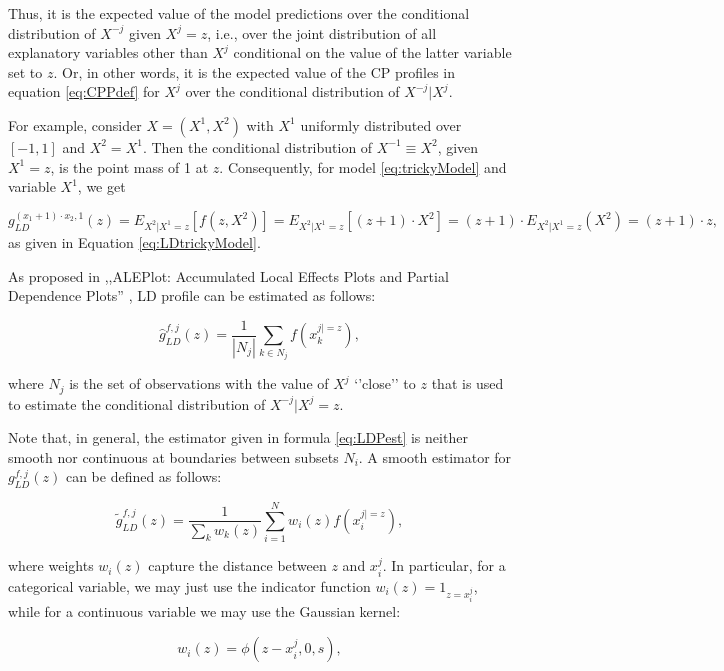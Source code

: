 \documentclass[]{krantz}
\begin{document}
Thus, it is the expected value of the model predictions over the conditional distribution of \(X^{-j}\) given \(X^j=z\), i.e., over the joint distribution of all explanatory variables other than \(X^j\) conditional on the value of the latter variable set to \(z\). Or, in other words, it is the expected value of the CP profiles in equation \eqref{eq:CPPdef} for \(X^j\) over the conditional distribution of \(X^{-j} | X^j\).

For example, consider \(X=(X^1,X^2)\) with \(X^1\) uniformly distributed over \([-1,1]\) and \(X^2=X^1\). Then the conditional distribution of \(X^{-1} \equiv X^2\), given \(X^1=z\), is the point mass of 1 at \(z\). Consequently, for model \eqref{eq:trickyModel} and variable \(X^1\), we get

\[
g_{LD}^{(x_1+1)\cdot x_2,1}(z) = E_{X^2|X^1=z}[f(z,X^2)] = E_{X^2|X^1=z}[(z+1)\cdot X^2] = (z+1)\cdot E_{X^2|X^1=z}(X^2) = (z+1)\cdot z,
\]
as given in Equation \eqref{eq:LDtrickyModel}.

As proposed in ,,ALEPlot: Accumulated Local Effects Plots and Partial Dependence Plots'' \citep{ALEPlotRPackage}, LD profile can be estimated as follows:

\begin{equation}
\hat g_{LD}^{f,j}(z) = \frac{1}{|N_j|} \sum_{k\in N_j} f\left(x_k^{j| = z}\right), 
\label{eq:LDPest}
\end{equation}

where \(N_j\) is the set of observations with the value of \(X^j\) `'close'' to \(z\) that is used to estimate the conditional distribution of \(X^{-j}|X^j=z\).

Note that, in general, the estimator given in formula \eqref{eq:LDPest} is neither smooth nor continuous at boundaries between subsets \(N_i\). A smooth estimator for \(g_{LD}^{f,j}(z)\) can be defined as follows:

\begin{equation}
\tilde g_{LD}^{f,j}(z) = \frac{1}{\sum_k w_{k}(z)} \sum_{i = 1}^N w_i(z) f(x_i^{j| = z}), 
\label{eq:LDPest2}
\end{equation}

where weights \(w_i(z)\) capture the distance between \(z\) and \(x_i^j\). In particular, for a categorical variable, we may just use the indicator function \(w_i(z) = 1_{z = x^j_i}\), while for a continuous variable we may use the Gaussian kernel:

\begin{equation}
w_i(z) = \phi(z - x_i^j, 0, s),
\label{eq:Gkernel}
\end{equation}
\end{document}
